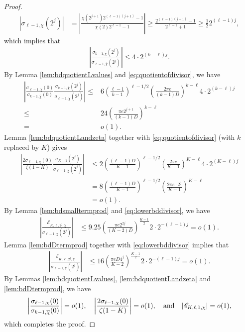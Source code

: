 \documentclass[11pt,letterpaper,reqno]{amsart}
\numberwithin{figure}{section}
\numberwithin{table}{section}
\theoremstyle{definition}
\theoremstyle{plain}
\theoremstyle{definition}
\theoremstyle{definition}
\theoremstyle{remark}
\numberwithin{equation}{section}
\theoremstyle{remark}
\begin{document}
\begin{proof}
\begin{align}
    |\sigma_{\ell-1,\chi}(2^j)|&=\left|\frac{\chi(2^{j+1})2^{(\ell-1)(j+1)}-1}{\chi(2)2^{\ell-1}-1}\right|\geq\frac{2^{(\ell-1)(j+1)}-1}{2^{\ell-1}+1}\geq\frac{1}{2}2^{(\ell-1)j},\label{eq:lowerbddivisor}
\end{align}
which implies that 
\begin{align}
    \left|\frac{\sigma_{k-1,\chi}(2^j)}{\sigma_{\ell-1,\overline{\chi}}(2^j)} \right|\leq 4\cdot2^{(k-\ell)j}.\label{eq:quotientofdivisor}
\end{align}
By Lemma \ref{lem:bdquotientLvalues} and \eqref{eq:quotientofdivisor}, we have 
\begin{align}
    \left|\frac{\sigma_{\ell-1,\chi}(0)}{\sigma_{k-1,\overline{\chi}}(0)}\frac{\sigma_{k-1,\overline{\chi}}(2^j)}{\sigma_{\ell-1,\chi}(2^j)}\right|
    \leq& 6\left(\frac{\ell-1}{k-1}\right)^{\ell-1/2}\left(\frac{2\pi e}{(k-1)D}\right)^{k-\ell}4\cdot2^{(k-\ell)j}  \nonumber\\
    \leq&24\left(\frac{\pi e 2^{j+1}}{(k-1)D}\right)^{k-\ell}\label{eq:bdagain}\\=&o(1).  \nonumber
\end{align}
Lemma \ref{lem:bdquotientLandzeta} together with \eqref{eq:quotientofdivisor} (with $k$ replaced by $K$) gives
\begin{align}
    \left|\frac{2\sigma_{\ell-1,\chi}(0)}{\zeta(1-K) }\frac{\sigma_{K-1}(2^j)}{\sigma_{\ell-1,\chi}(2^j)}\right|&\leq 2\left(\frac{(\ell-1)D}{K-1}\right)^{\ell-1/2}\left(\frac{2\pi e}{K-1}\right)^{K-\ell}4\cdot 2^{(K-\ell)j}  \nonumber\\&=8\left(\frac{(\ell-1)D}{K-1}\right)^{\ell-1/2}\left(\frac{2\pi e\cdot 2^j}{K-1}\right)^{K-\ell}\label{eq:bdquotienttwistandzeta}
    \\&=o(1).  \nonumber
\end{align}
By Lemma \ref{lem:bdsmalltermprod} and \eqref{eq:lowerbddivisor}, we have 
\begin{align*}
    \left|\frac{\mathcal{E}_{K,\ell,2^j,\chi}}{\sigma_{\ell-1,\chi}(2^j)}\right|&\leq 9.25\left(\frac{\pi e2^{2j}}{(K-2)D}\right)^{\frac{K-1}{2}}2\cdot 2^{-(\ell-1)j}=o(1).
\end{align*}
Lemma \ref{lem:bdDtermprod} together with \eqref{eq:lowerbddivisor} implies that
\begin{align*}
  \left|  \frac{\mathscr{E}_{K,\ell,2^j,\chi}}{\sigma_{\ell-1,\chi}(2^j)}\right|&\leq16\left(\frac{\pi eD4^j}{K-2}\right)^{\frac{K-1}{2}}2\cdot2^{-(\ell-1)j}=o(1).
\end{align*}
By Lemmas \ref{lem:bdquotientLvalues}, \ref{lem:bdquotientLandzeta} and \ref{lem:bdDtermprod}, we have  
\begin{align*}
    \left|\frac{\sigma_{\ell-1,\chi}(0)}{\sigma_{k-1,\overline{\chi}}(0)}\right|=o(1),\quad\left|\frac{2\sigma_{\ell-1,\chi}(0)}{\zeta(1-K)}\right|=o(1),\quad{\rm and}\quad|\mathscr{E}_{K,\ell,1,\chi}|=o(1),
\end{align*}
which completes the proof.
\end{proof}
\end{document}
